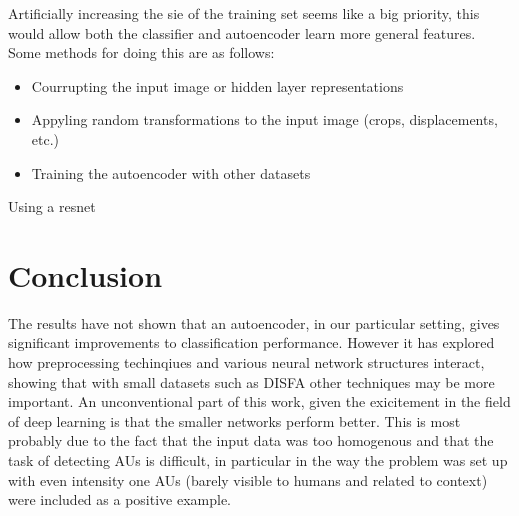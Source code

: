     Artificially increasing the sie of the training set seems like a big priority,
    this would allow both the classifier and autoencoder learn more general features.
    Some methods for doing this are as follows:

    \begin{itemize}
      \item Courrupting the input image or hidden layer representations
      \item Appyling random transformations to the input image (crops, displacements, etc.)
      \item Training the autoencoder with other datasets
    \end{itemize}

    Using a resnet

  \section{Conclusion}
    The results have not shown that an autoencoder, in our particular setting,
    gives significant improvements to classification performance. However it has
    explored how preprocessing techinqiues and various neural network structures
    interact, showing that with small datasets such as DISFA other techniques may
    be more important. An unconventional part of this work, given the exicitement
    in the field of deep learning is that the smaller networks perform better.
    This is most probably due to the fact that the input data was too homogenous
    and that the task of detecting AUs is difficult, in particular in the way the problem was set up
    with even intensity one AUs (barely visible to humans and related to context)
    were included as a positive example.
